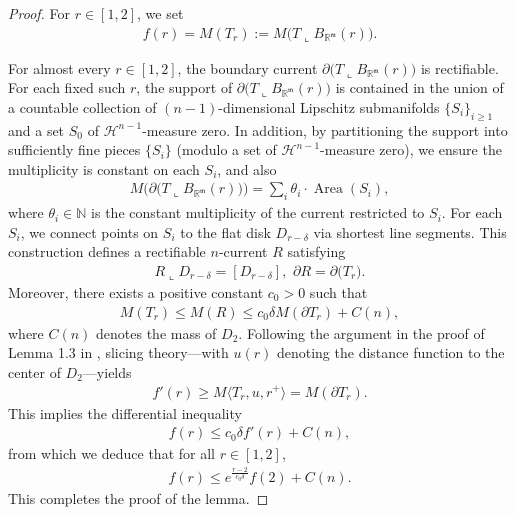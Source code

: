 \documentclass[11pt,reqno]{amsart}
\newcommand{\fm}{\mathfrak{m}}
\renewcommand{\leq}{\leqslant}
\renewcommand{\geq}{\geqslant}
\theoremstyle{definition}
\numberwithin{equation}{section}
\begin{document}
\begin{proof}
For $r\in [1, 2]$, we set
\begin{align}
    f(r) = M(T_r) :=  M\bigl(T \mathbin{\llcorner} B_{\mathbb{R}^\fm}(r)\bigr).
\end{align}

    For almost every $r\in [1,2]$, the boundary current $\partial\bigl(T \mathbin{\llcorner} B_{\mathbb{R}^\fm}(r)\bigr)$ is rectifiable. For each fixed such $r$, the support of $\partial\bigl(T \mathbin{\llcorner} B_{\mathbb{R}^\fm}(r)\bigr)$ is contained in the union of a countable collection of $(n-1)$-dimensional Lipschitz submanifolds $\{S_i\}_{i\geq 1}$ and a set $S_0$ of $\mathcal{H}^{n-1}$-measure zero. In addition, by partitioning the support into sufficiently fine pieces $\{S_i\}$ (modulo a set of $\mathcal{H}^{n-1}$-measure zero), we ensure the multiplicity is constant on each $S_i$, and also
\begin{align}
M\bigl(\partial\bigl(T \mathbin{\llcorner} B_{\mathbb{R}^\fm}(r)\bigr)\bigr) = \sum_i \theta_i \cdot \operatorname{Area}(S_i),
\end{align}
where $\theta_i \in \mathbb{N}$ is the constant multiplicity of the current restricted to $S_i$.
    For each $S_i$, we connect points on $S_i$ to the flat disk $D_{r-\delta}$ via shortest line segments. This construction defines a rectifiable $n$-current $R$ satisfying
    \begin{align}
        R \mathbin{\llcorner} D_{r-\delta} = [D_{r-\delta}], \,\,
        \partial R = \partial\bigl(T_r).
    \end{align}
    Moreover, there exists a positive constant $c_0>0$ such that
    \begin{align}
        M(T_r) \leq M(R) \leq c_0 \delta M(\partial T_r) + C(n),
    \end{align}
    where $C(n)$ denotes the mass of $D_2$. Following the argument in the proof of Lemma 1.3 in \cite{Lin1989CPAM}, slicing theory—with $u(r)$ denoting the distance function to the center of $D_2$—yields
\begin{align}\label{eq-f1}
    f'(r) \geq M\langle T_r, u, r^+\rangle = M(\partial T_r).
\end{align}
This implies the differential inequality
\begin{align}
    f(r) \leq c_0\delta f'(r) + C(n),
\end{align}
from which we deduce that for all $r\in [1,2]$,
\begin{align}
    f(r) \leq e^{\frac{r-2}{c_0\delta}}f(2) +C(n).
\end{align}
This completes the proof of the lemma.
\end{proof}
\end{document}
